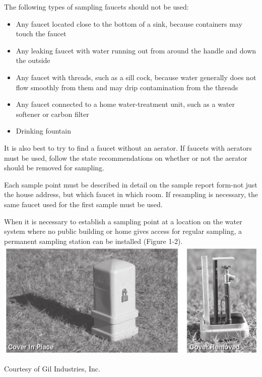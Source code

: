 \documentclass[10pt]{article}
\begin{document}
The following types of sampling faucets should not be used:

\begin{itemize}
  \item Any faucet located close to the bottom of a sink, because containers may touch the faucet

  \item Any leaking faucet with water running out from around the handle and down the outside

  \item Any faucet with threads, such as a sill cock, because water generally does not flow smoothly from them and may drip contamination from the threads

  \item Any faucet connected to a home water-treatment unit, such as a water softener or carbon filter

  \item Drinking fountain

\end{itemize}
It is also best to try to find a faucet without an aerator. If faucets with aerators must be used, follow the state recommendations on whether or not the aerator should be removed for sampling.

Each sample point must be described in detail on the sample report form-not just the house address, but which faucet in which room. If resampling is necessary, the same faucet used for the first sample must be used.

When it is necessary to establish a sampling point at a location on the water system where no public building or home gives access for regular sampling, a permanent sampling station can be installed (Figure 1-2).\\

\includegraphics[max width=\textwidth]{2022_09_17_867b38c7c364bb842283g-08}

Courtesy of Gil Industries, Inc.
\end{document}
